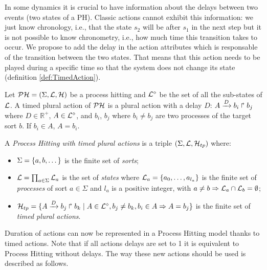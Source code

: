 In some dynamics it is crucial to have information about the delays between two events (two states of a PH). Classic actions cannot exhibit this information: we just know chronology, i.e., that the state $s_2$ will be after $s_1$ in the next step but it is not possible to know chronometry, i.e., how much time this transition takes to occur. We propose to add the delay in the action attributes which is responsable of the transition between the two states. That means that this action needs to be played during a specific time so that the system does not change its state (definition \ref{def:TimedAction}).

\begin{definition}
\label{def:TimedAction}
\label{def:TimedAction}
Let $\mathcal{PH} = (\Sigma,\mathcal{L},\mathcal{H})$ be a process hitting and $\mathcal{L}^{\diamond}$ be the set of all the sub-states of $\mathcal{L}$.
A timed plural action of $\mathcal{PH}$ is a plural action with a delay $D$: $A\xrightarrow{D} b_i \Rsh b_j$ where $D \in \mathds{R}^+$, $A \in \mathcal{L}^{\diamond}$, and $b_i$, $b_j$ where  $b_i \not = b_j$ are two processes of the target sort $b$. If $b_i \in A$, $A=b_i$.
\end{definition}

\begin{definition}\label{def:PH-plural}
  A \emph{Process Hitting with timed plural actions} is a triple $(\Sigma,\mathcal{L},\mathcal{H}_{tp})$ where:
  \begin{itemize}
    \item  $\Sigma = \{a,b,\dots\}$ is the finite set of \emph{sorts};
    \item  $\mathcal{L} = \prod_{a\in\Sigma} \mathcal{L}_a$ is the set of \emph{states} where
      $\mathcal{L}_a = \{a_0,\dots,a_{l_a}\}$
      is the finite set of \emph{processes} of sort $a\in\Sigma$
      and $l_a$ is a positive integer, with $a\neq b\Rightarrow \mathcal{L}_a \cap \mathcal{L}_b = \emptyset$;
    \item  $\mathcal{H}_{tp} = \{ A\xrightarrow{D} b_j \Rsh b_k  \mid A \in \mathcal{L}^{\diamond}, b_j\neq b_k, b_i \in A \Rightarrow A=b_j\}$
      is the finite set of \emph{timed plural actions}.
  \end{itemize}
\end{definition}

Duration of actions can now be represented in a Process Hitting model thanks to timed actions.
Note that if all actions delays are set to 1 it is equivalent to Process Hitting without delays.
The way these new actions should be used is described as follows.

